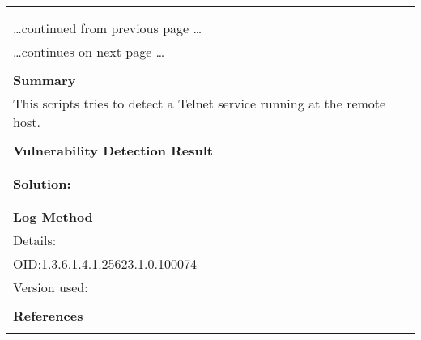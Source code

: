 \documentclass{article}
\begin{document}
\begin{longtable}{|p{}|}
\hline
\rowcolor{gvm_log}{\color{white}{Log (CVSS: 0.0) }}\\
\rowcolor{gvm_log}{\color{white}{NVT: Telnet Service Detection}}\\
\hline
\endfirsthead
\hfill\ldots continued from previous page \ldots \\
\hline
\endhead
\hline
\ldots continues on next page \ldots \\
\endfoot
\hline
\endlastfoot
\\
\textbf{Summary}\\
This scripts tries to detect a Telnet service running
  at the remote host.\\

        \hline
        \\
\textbf{Vulnerability Detection Result}\\
\rowcolor{white}{\verb=A Telnet server seems to be running on this port=}\\

          \hline
          \\
\textbf{Solution:}\\
\\


        \hline
        \\
\textbf{Log Method}\\
Details:
\rowcolor{white}{\verb=Telnet Service Detection=}\\
OID:1.3.6.1.4.1.25623.1.0.100074\\
Version used:
\rowcolor{white}{\verb=2020-11-10T15:30:28Z=}\\

      \hline
      \\
\textbf{References}\\
\rowcolor{white}{\verb=url: https://tools.ietf.org/html/rfc854=}\\
\end{longtable}
\end{document}
